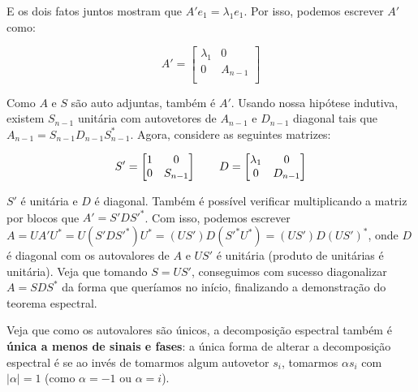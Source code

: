 \documentclass[11pt, a4paper]{article}
\begin{document}
E os dois fatos juntos mostram que \(A'e_1=\lambda_1e_1\). Por isso, podemos escrever \(A'\) como:

\void[-0.7]

\[
A'=
\begin{bmatrix}
    \lambda_1 & 0\\
    0 & A_{n-1}\\
\end{bmatrix}
\]

\void[-0.3]

Como \(A\) e \(S\) são auto adjuntas, também é \(A'\). Usando nossa hipótese indutiva, existem \(S_{n-1}\) unitária com autovetores de \(A_{n-1}\) e \(D_{n-1}\) diagonal tais que \(A_{n-1}=S_{n-1}D_{n-1}S^*_{n-1}\). Agora, considere as seguintes matrizes:

\void[-0.7]

\[
S'=
\begin{bmatrix}
    1 & 0\\
    0 & S_{n-1}\\
\end{bmatrix}
\tb[2]
D=
\begin{bmatrix}
    \lambda_1 & 0\\
    0 & D_{n-1}\\
\end{bmatrix}
\]

\(S'\) é unitária e \(D\) é diagonal. Também é possível verificar multiplicando a matriz por blocos que \(A'=S'DS'^*\). Com isso, podemos escrever \(A=UA'U^*=U(S'DS'^*)U^*=(US')D(S'^*U^*)=(US')D(US')^*\), onde \(D\) é diagonal com os autovalores de \(A\) e \(US'\) é unitária (produto de unitárias é unitária). Veja que tomando \(S=US'\), conseguimos com sucesso diagonalizar \(A=SDS^*\) da forma que queríamos no início, finalizando a demonstração do teorema espectral.

Veja que como os autovalores são únicos, a decomposição espectral também é \textbf{única a menos de sinais e fases}: a única forma de alterar a decomposição espectral é se ao invés de tomarmos algum autovetor \(s_i\), tomarmos \(\alpha s_i\) com \(|\alpha|=1\) (como \(\alpha=-1\) ou \(\alpha=i\)).

\void[-0.3]

\newpage
\end{document}
